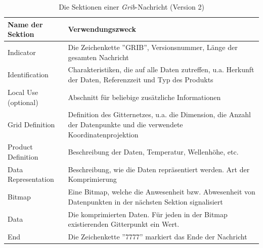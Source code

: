 \begin{table}
  \centering
  {\sf
    \footnotesize
    \begin{longtable}{@{}lp{10cm}@{}}

      \toprule
      \textbf{Name der Sektion} & \textbf{Verwendungszweck} \\

      \midrule
      Indicator & Die Zeichenkette ''GRIB'', Versionsnummer, Länge der gesamten Nachricht \\

      Identification & Charakteristiken, die auf alle Daten zutreffen, u.a. Herkunft der Daten, Referenzzeit und Typ des Produkts \\

      Local Use (optional) & Abschnitt für beliebige zusätzliche Informationen \\

      Grid Definition &  Definition des Gitternetzes, u.a. die Dimension, die Anzahl der Datenpunkte und die verwendete Koordinatenprojektion \\

      Product Definition &  Beschreibung der Daten, Temperatur, Wellenhöhe, etc. \\

      Data Representation &  Beschreibung, wie die Daten repräsentiert werden. Art der Komprimierung \\

      Bitmap & Eine Bitmap, welche die Anwesenheit bzw. Abwesenheit von Datenpunkten in der nächsten Sektion signalisiert \\

      Data &  Die komprimierten Daten. Für jeden in der Bitmap existierenden Gitterpunkt ein Wert. \\

      End & Die Zeichenkette ''7777'' markiert das Ende der Nachricht \\

      \bottomrule

    \end{longtable}
  }

  \caption{Die Sektionen einer \textit{Grib}-Nachricht (Version 2)}
  \label{tab:grib}

\end{table}

